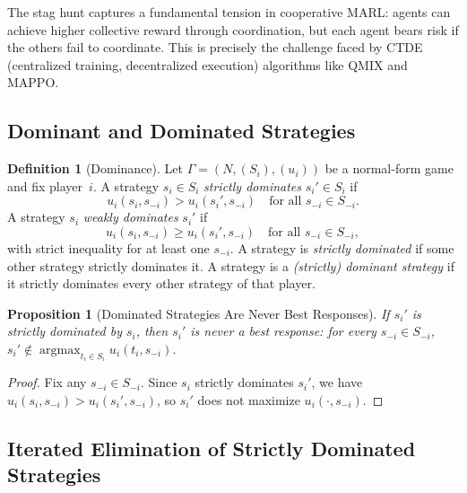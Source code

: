 \documentclass[11pt,a4paper]{article}
\theoremstyle{definition}
\newtheorem{definition}{Definition}[section]
\theoremstyle{plain}
\newtheorem{proposition}[theorem]{Proposition}
\theoremstyle{remark}
\DeclareMathOperator{\argmax}{argmax}
\begin{document}
\begin{rlconnection}
The stag hunt captures a fundamental tension in cooperative MARL: agents can achieve
higher collective reward through coordination, but each agent bears risk if the others
fail to coordinate. This is precisely the challenge faced by CTDE (centralized training,
decentralized execution) algorithms like QMIX and MAPPO.
\end{rlconnection}

\subsection{Dominant and Dominated Strategies}
\label{subsec:dominance}

\begin{definition}[Dominance]
\label{def:dominance}
Let $\Gamma = (N, (S_i), (u_i))$ be a normal-form game and fix player~$i$.
A strategy $s_i \in S_i$ \emph{strictly dominates} $s_i' \in S_i$ if
\[
    u_i(s_i, s_{-i}) > u_i(s_i', s_{-i}) \quad \text{for all } s_{-i} \in S_{-i}.
\]
A strategy $s_i$ \emph{weakly dominates} $s_i'$ if
\[
    u_i(s_i, s_{-i}) \geq u_i(s_i', s_{-i}) \quad \text{for all } s_{-i} \in S_{-i},
\]
with strict inequality for at least one $s_{-i}$.
A strategy is \emph{strictly dominated} if some other strategy strictly dominates it.
A strategy is a \emph{(strictly) dominant strategy} if it strictly dominates every
other strategy of that player.
\end{definition}

\begin{proposition}[Dominated Strategies Are Never Best Responses]
\label{prop:dominated_not_br}
If $s_i'$ is strictly dominated by $s_i$, then $s_i'$ is never a best response:
for every $s_{-i} \in S_{-i}$, $s_i' \notin \argmax_{t_i \in S_i} u_i(t_i, s_{-i})$.
\end{proposition}

\begin{proof}
Fix any $s_{-i} \in S_{-i}$. Since $s_i$ strictly dominates $s_i'$, we have
$u_i(s_i, s_{-i}) > u_i(s_i', s_{-i})$, so $s_i'$ does not maximize $u_i(\cdot, s_{-i})$.
\end{proof}

\subsection{Iterated Elimination of Strictly Dominated Strategies}
\label{subsec:iesds}
\end{document}

